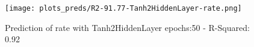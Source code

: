 
\begin{figure}[H]
    \centering
    \texttt{[image: plots\_preds/R2-91.77-Tanh2HiddenLayer-rate.png]}
    \caption{Prediction of rate with Tanh2HiddenLayer epochs:50 - R-Squared: 0.92}
\end{figure}
